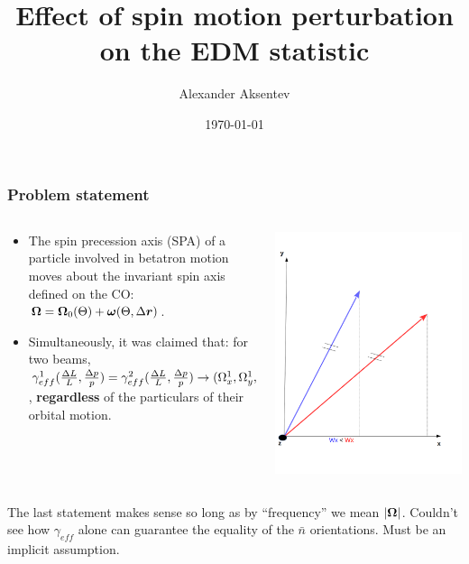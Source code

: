 \documentclass{beamer}
\title{Effect of spin motion perturbation on the EDM statistic}
\author{Alexander Aksentev}
\date{\today}
\begin{document}
\begin{frame}
  \titlepage
\end{frame}

\begin{frame}
  \frametitle{Problem statement}
  \begin{columns}
    \begin{column}{.6\textwidth}
      \begin{itemize}
      \item The spin precession axis (SPA) of a particle involved in betatron motion moves about the invariant spin axis defined on the CO: $\boldsymbol{\Omega} = \boldsymbol{\Omega}_0(\Theta) + \boldsymbol{\omega}(\Theta, \Delta\boldsymbol r)$.
      \item Simultaneously, it was claimed that: for two beams, $\gamma_{eff}^1(\frac{\Delta L}{L}, \frac{\Delta p}{p}) = \gamma_{eff}^2(\frac{\Delta L}{L}, \frac{\Delta p}{p}) \rightarrow (\Omega_x^1, \Omega_y^1, \Omega_z^1) = (\Omega_x^2, \Omega_y^2, \Omega_z^2) $, \textbf{regardless} of the particulars of their orbital motion.
      \end{itemize}
    \end{column}
    \begin{column}{.4\textwidth}
  \begin{center}
    \includegraphics[height=.62\paperheight]{img/spin_axis_motion/presentation/nbar_arrows}
  \end{center}
  \end{column}
  \end{columns}
  The last statement makes sense so long as by ``frequency'' we mean $|\boldsymbol{\Omega}|$. Couldn't see how $\gamma_{eff}$ alone can guarantee the equality of the $\bar n$ orientations. Must be an implicit assumption.
\end{frame}
\end{document}
